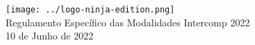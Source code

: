 \begin{center}

	\vspace*{\fill}
	{\let\clearpage\relax \texttt{[image: ../logo-ninja-edition.png]} \\ [.5cm]}
	\Huge{Regulamento Específico das Modalidades Intercomp 2022} \\ [.5cm]
	\normalsize{10 de Junho de 2022}
	\vspace*{\fill}

\end{center}

